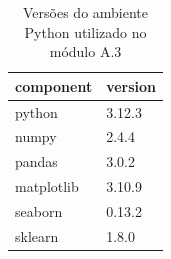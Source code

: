 \begin{table}[htbp]
\centering
\begin{tabular}{ll}
\hline
component & version \\
\hline
python & 3.12.3 \\
numpy & 2.4.4 \\
pandas & 3.0.2 \\
matplotlib & 3.10.9 \\
seaborn & 0.13.2 \\
sklearn & 1.8.0 \\
\hline
\end{tabular}
\caption{Versões do ambiente Python utilizado no módulo A.3}
\label{tab:environment-versions}
\end{table}